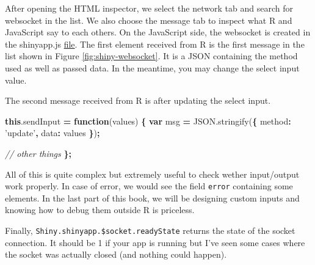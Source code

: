 \documentclass[]{book}
\newenvironment{Shaded}{\begin{snugshade}}{\end{snugshade}}
\newcommand{\AttributeTok}[1]{\textcolor[rgb]{0.77,0.63,0.00}{#1}}
\newcommand{\CommentTok}[1]{\textcolor[rgb]{0.56,0.35,0.01}{\textit{#1}}}
\newcommand{\DataTypeTok}[1]{\textcolor[rgb]{0.13,0.29,0.53}{#1}}
\newcommand{\KeywordTok}[1]{\textcolor[rgb]{0.13,0.29,0.53}{\textbf{#1}}}
\newcommand{\NormalTok}[1]{#1}
\newcommand{\OperatorTok}[1]{\textcolor[rgb]{0.81,0.36,0.00}{\textbf{#1}}}
\newcommand{\StringTok}[1]{\textcolor[rgb]{0.31,0.60,0.02}{#1}}
\newcommand{\VariableTok}[1]{\textcolor[rgb]{0.00,0.00,0.00}{#1}}
\begin{document}
After opening the HTML inspector, we select the network tab and search for websocket in the list. We also choose the message tab to inspect what R and JavaScript say to each others. On the JavaScript side, the websocket is created in the shinyapp.js \href{https://github.com/rstudio/shiny/blob/master/srcjs/shinyapp.js}{file}. The first element received from R is the first message in the list shown in Figure \ref{fig:shiny-websocket}. It is a JSON containing the method used as well as passed data. In the meantime, you may change the select input value.

\begin{Shaded}
\end{Shaded}

The second message received from R is after updating the select input.

\begin{Shaded}
\begin{Highlighting}[]
\KeywordTok{this}\NormalTok{.}\AttributeTok{sendInput} \OperatorTok{=} \KeywordTok{function}\NormalTok{(values) }\OperatorTok{\{}
  \KeywordTok{var}\NormalTok{ msg }\OperatorTok{=} \VariableTok{JSON}\NormalTok{.}\AttributeTok{stringify}\NormalTok{(}\OperatorTok{\{}
    \DataTypeTok{method}\OperatorTok{:} \StringTok{'update'}\OperatorTok{,}
    \DataTypeTok{data}\OperatorTok{:}\NormalTok{ values}
  \OperatorTok{\}}\NormalTok{)}\OperatorTok{;}

  \CommentTok{// other things}
\OperatorTok{\};}
\end{Highlighting}
\end{Shaded}

All of this is quite complex but extremely useful to check wether input/output work properly. In case of error, we would see the field \texttt{error} containing some elements. In the last part of this book, we will be designing custom inputs and knowing how to debug them outside R is priceless.

Finally, \texttt{Shiny.shinyapp.\$socket.readyState} returns the state of the socket connection. It should be 1 if your app is running but I've seen some cases where the socket was actually closed (and nothing could happen).
\end{document}
